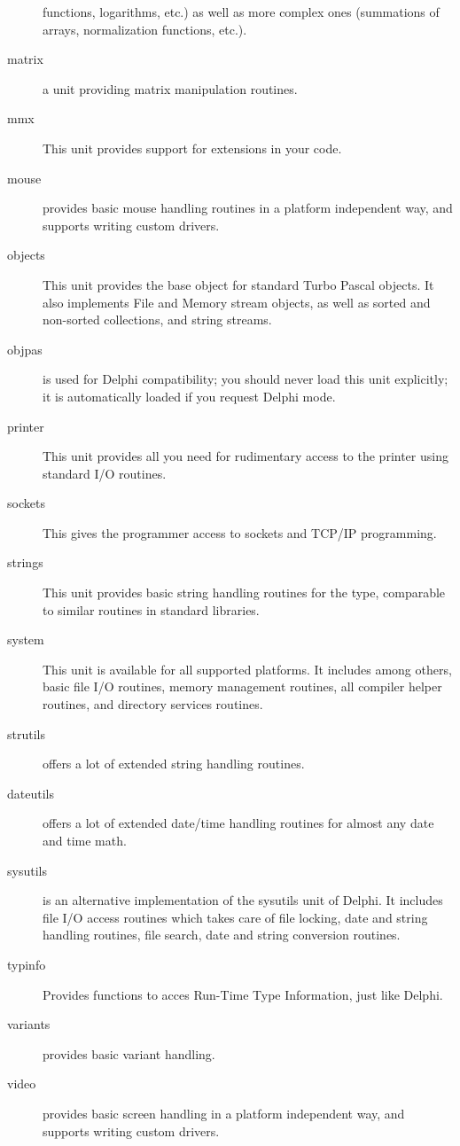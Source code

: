 \begin{description}
functions, logarithms, etc.) as well as more complex ones (summations of arrays,
normalization functions, etc.).
\item[matrix] a unit providing matrix manipulation routines.
\item[mmx] This unit provides support for  extensions in your
code. 
\item[mouse] provides basic mouse handling routines in a platform independent way,
and supports writing custom drivers. 
\item [objects]  This unit provides the base object for standard Turbo Pascal
objects. It also implements File and Memory stream objects, as well as sorted
and non-sorted collections, and string streams.
\item[objpas] is used for Delphi compatibility; you should never load this
unit explicitly; it is automatically loaded if you request Delphi mode.
\item[printer]  This unit provides all you need for rudimentary access
to the printer using standard I/O routines.
\item[sockets] This gives the programmer access to sockets and TCP/IP 
programming.
\item[strings] This unit provides basic string handling routines for the
 type, comparable to similar routines in standard 
libraries.
\item[system] This unit is available for all supported platforms. It includes
among others, basic file I/O routines, memory management routines, all compiler 
helper routines, and directory services routines. 
\item[strutils] offers a lot of extended string handling routines. 
\item[dateutils] offers a lot of extended date/time handling routines for 
almost any date and time math. 
\item[sysutils] is an alternative implementation of the sysutils unit of
Delphi. It includes file I/O access routines which takes care of file
locking, date and string handling routines, file search, date and string 
conversion routines.
\item[typinfo] Provides functions to acces Run-Time Type Information, just
like Delphi.
\item[variants] provides basic variant handling.
\item[video] provides basic screen handling in a platform independent way,
and supports writing custom drivers.
\end{description}

